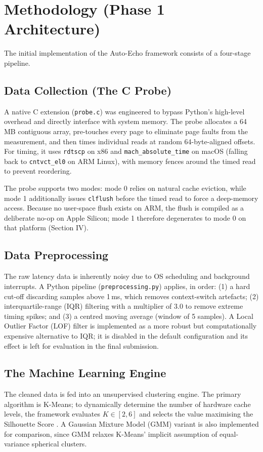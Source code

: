 \documentclass[conference]{IEEEtran}
\begin{document}
\section{Methodology (Phase 1 Architecture)}
The initial implementation of the Auto-Echo framework consists of a four-stage pipeline.

\subsection{Data Collection (The C Probe)}
A native C extension (\texttt{probe.c}) was engineered to bypass Python's high-level overhead and directly interface with system memory. The probe allocates a 64\,MB contiguous array, pre-touches every page to eliminate page faults from the measurement, and then times individual reads at random 64-byte-aligned offsets. For timing, it uses \texttt{rdtscp} on x86 and \texttt{mach\_absolute\_time} on macOS (falling back to \texttt{cntvct\_el0} on ARM Linux), with memory fences around the timed read to prevent reordering.

The probe supports two modes: mode 0 relies on natural cache eviction, while mode 1 additionally issues \texttt{clflush} before the timed read to force a deep-memory access. Because no user-space flush exists on ARM, the flush is compiled as a deliberate no-op on Apple Silicon; mode 1 therefore degenerates to mode 0 on that platform (Section IV).

\subsection{Data Preprocessing}
The raw latency data is inherently noisy due to OS scheduling and background interrupts. A Python pipeline (\texttt{preprocessing.py}) applies, in order: (1) a hard cut-off discarding samples above 1\,ms, which removes context-switch artefacts; (2) interquartile-range (IQR) filtering with a multiplier of 3.0 to remove extreme timing spikes; and (3) a centred moving average (window of 5 samples). A Local Outlier Factor (LOF) filter \cite{lof} is implemented as a more robust but computationally expensive alternative to IQR; it is disabled in the default configuration and its effect is left for evaluation in the final submission.

\subsection{The Machine Learning Engine}
The cleaned data is fed into an unsupervised clustering engine. The primary algorithm is K-Means; to dynamically determine the number of hardware cache levels, the framework evaluates $K \in [2, 6]$ and selects the value maximising the Silhouette Score \cite{silhouette}. A Gaussian Mixture Model (GMM) variant is also implemented for comparison, since GMM relaxes K-Means' implicit assumption of equal-variance spherical clusters.
\end{document}
